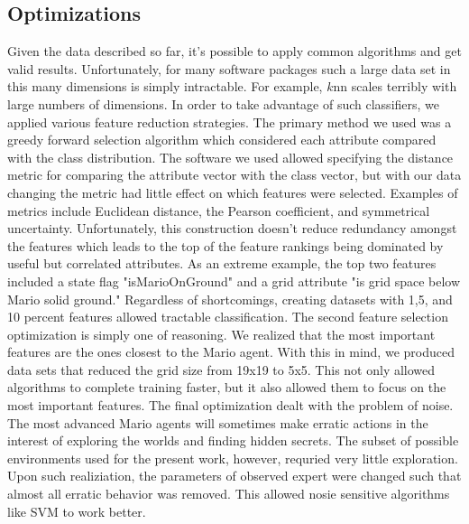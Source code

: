 \documentclass[]{article}   %
\begin{document}
\subsection{Optimizations}
Given the data described so far, it's possible to apply common algorithms and get valid results.  Unfortunately, for many software packages such a large data set in this many dimensions is simply intractable.  For example, $k$nn scales terribly with large numbers of dimensions.  In order to take advantage of such classifiers, we applied various feature reduction strategies.
\newline\newline
The primary method we used was a greedy forward selection algorithm which considered each attribute compared with the class distribution.  The software we used allowed specifying the distance metric for comparing the attribute vector with the class vector, but with our data changing the metric had little effect on which features were selected.  Examples of metrics include Euclidean distance, the Pearson coefficient, and symmetrical uncertainty.  Unfortunately, this construction doesn't reduce redundancy amongst the features which leads to the top of the feature rankings being dominated by useful but correlated attributes.  As an extreme example, the top two features included a state flag "isMarioOnGround" and a grid attribute "is grid space below Mario solid ground."  Regardless of shortcomings, creating datasets with 1,5, and 10 percent features allowed tractable classification.
\newline\newline
The second feature selection optimization is simply one of reasoning.  We realized that the most important features are the ones closest to the Mario agent.  With this in mind, we produced data sets that reduced the grid size from 19x19 to 5x5.  This not only allowed algorithms to complete training faster, but it also allowed them to focus on the most important features.
\newline\newline
The final optimization dealt with the problem of noise.  The most advanced Mario agents will sometimes make erratic actions in the interest of exploring the worlds and finding hidden secrets.  The subset of possible environments used for the present work, however, requried very little exploration.  Upon such realiziation, the parameters of observed expert were changed such that almost all erratic behavior was removed.  This allowed nosie sensitive algorithms like SVM to work better.
\end{document}
